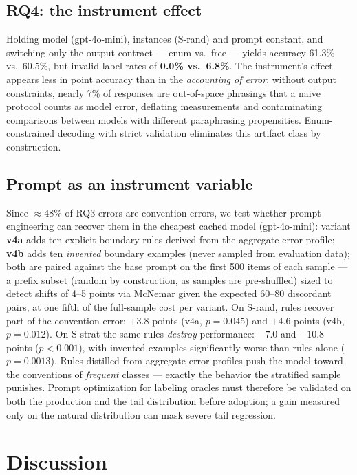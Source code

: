 \documentclass[11pt]{article}
\begin{document}
\subsection{RQ4: the instrument effect}

Holding model (gpt-4o-mini), instances (S-rand) and prompt constant, and
switching only the output contract --- enum vs.\ free --- yields accuracy
61.3\% vs.\ 60.5\%, but invalid-label rates of \textbf{0.0\% vs.\ 6.8\%}.
The instrument's effect appears less in point accuracy than in the
\emph{accounting of error}: without output constraints, nearly 7\% of
responses are out-of-space phrasings that a naive protocol counts as model
error, deflating measurements and contaminating comparisons between models
with different paraphrasing propensities. Enum-constrained decoding with
strict validation eliminates this artifact class by construction.

\subsection{Prompt as an instrument variable}
\label{sec:prompt}

Since $\approx 48\%$ of RQ3 errors are convention errors, we test whether
prompt engineering can recover them in the cheapest cached model
(gpt-4o-mini): variant \textbf{v4a} adds ten explicit boundary rules
derived from the aggregate error profile; \textbf{v4b} adds ten
\emph{invented} boundary examples (never sampled from evaluation data);
both are paired against the base prompt on the first 500 items of each
sample --- a prefix subset (random by construction, as samples are
pre-shuffled) sized to detect shifts of 4--5 points via McNemar given the
expected 60--80 discordant pairs, at one fifth of the full-sample cost per
variant. On S-rand, rules recover part of the convention error: $+3.8$
points (v4a, $p=0.045$) and $+4.6$ points (v4b, $p=0.012$). On S-strat the
same rules \emph{destroy} performance: $-7.0$ and $-10.8$ points
($p<0.001$), with invented examples significantly worse than rules alone
($p=0.0013$). Rules distilled from aggregate error profiles push the model
toward the conventions of \emph{frequent} classes --- exactly the behavior
the stratified sample punishes. Prompt optimization for labeling oracles
must therefore be validated on both the production and the tail
distribution before adoption; a gain measured only on the natural
distribution can mask severe tail regression.

\section{Discussion}
\label{sec:discussion}
\end{document}
